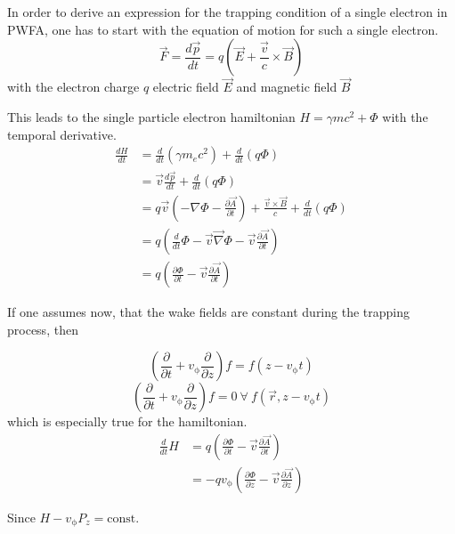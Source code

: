 In order to derive an expression for the trapping condition of a single electron in PWFA, one has to start with the equation of motion for such a single electron. 
\begin{equation}
\vec{F}=\frac{d\vec{p}}{dt}=q(\vec{E}+\frac{\vec{v}}{c}\times\vec{B})
\end{equation}
with the electron charge $q$ electric field $\vec{E}$ and magnetic field $\vec{B}$

This leads to the single particle electron hamiltonian $ H=\gamma m c^2+\Phi$ with the temporal derivative.
\begin{align}
\frac{dH}{dt}&=\frac{d}{dt} (\gamma m_e c^2)+\frac{d}{dt}(q\Phi)\\
&=\vec{v}\frac{d\vec{p}}{dt}+\frac{d}{dt}(q\Phi)\\
&=q\vec{v}(-\nabla \Phi-\frac{\partial \vec{A}}{\partial t})+\frac{\vec{v}\times\vec{B}}{c}+\frac{d}{dt}(q\Phi)\\
&=q(\frac{d}{dt}\Phi-\vec{v}\vec{\nabla}\Phi-\vec{v}\frac{\partial \vec{A}}{\partial t})\\
&=q(\frac{\partial \Phi}{\partial t}-\vec{v}\frac{\partial \vec{A}}{\partial t})
\end{align}

If one assumes now, that the wake fields are constant during the trapping process, then 

\begin{equation}
(\frac{\partial}{\partial t}+v_\mathrm{\phi} \frac{\partial}{\partial z} ) f =   f ( z-v_\mathrm{\phi} t)
\end{equation}\begin{equation}
(\frac{\partial}{\partial t}+v_\mathrm{\phi} \frac{\partial}{\partial z} ) f =0 \ \forall \   f (\vec{r}, z-v_\mathrm{\phi} t)
\end{equation}
which is especially true for the hamiltonian.
\begin{align*}
\frac{d}{dt}H&=q(\frac{\partial \Phi}{\partial t}-\vec{v}\frac{\partial \vec{A}}{\partial t})\\
&=-q v_\mathrm{\phi}(\frac{\partial \Phi}{\partial z}-\vec{v} \frac{\partial \vec{A}}{\partial z}) 
\end{align*}

Since $H-v_\mathrm{\phi}P_z=\mathrm{const.}$

